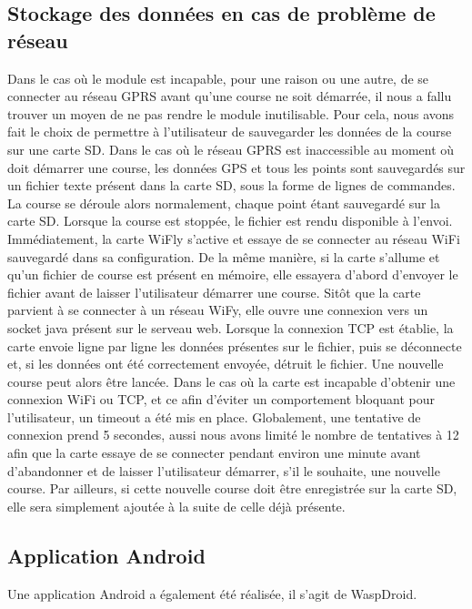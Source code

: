 \documentclass[a4paper,11pt]{article}
\begin{document}
\subsection{Stockage des données en cas de problème de réseau}
Dans le cas où le module est incapable, pour une raison ou une autre, de se connecter au réseau GPRS avant qu'une course ne soit démarrée, il nous a fallu trouver un moyen de ne pas rendre le module inutilisable. Pour cela, nous avons fait le choix de permettre à l'utilisateur de sauvegarder les données de la course sur une carte SD.\newline
Dans le cas où le réseau GPRS est inaccessible au moment où doit démarrer une course, les données GPS et tous les points sont sauvegardés sur un fichier texte présent dans la carte SD, sous la forme de lignes de commandes. La course se déroule alors normalement, chaque point étant sauvegardé sur la carte SD.\newline
Lorsque la course est stoppée, le fichier est rendu disponible à l'envoi. Immédiatement, la carte WiFly s'active et essaye de se connecter au réseau WiFi sauvegardé dans sa configuration. De la même manière, si la carte s'allume et qu'un fichier de course est présent en mémoire, elle essayera d'abord d'envoyer le fichier avant de laisser l'utilisateur démarrer une course.\newline
Sitôt que la carte parvient à se connecter à un réseau WiFy, elle ouvre une connexion vers un socket java présent sur le serveau web. Lorsque la connexion TCP est établie, la carte envoie ligne par ligne les données présentes sur le fichier, puis se déconnecte et, si les données ont été correctement envoyée, détruit le fichier. Une nouvelle course peut alors être lancée.\newline
Dans le cas où la carte est incapable d'obtenir une connexion WiFi ou TCP, et ce afin d'éviter un comportement bloquant pour l'utilisateur, un timeout a été mis en place. Globalement, une tentative de connexion prend 5 secondes, aussi nous avons limité le nombre de tentatives à 12 afin que la carte essaye de se connecter pendant environ une minute avant d'abandonner et de laisser l'utilisateur démarrer, s'il le souhaite, une nouvelle course. Par ailleurs, si cette nouvelle course doit être enregistrée sur la carte SD, elle sera simplement ajoutée à la suite de celle déjà présente.\newline
\subsection{Application Android}
Une application Android a également été réalisée, il s'agit de WaspDroid.
\end{document}
